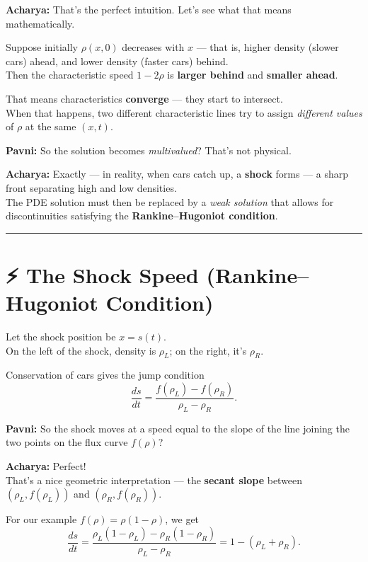 \documentclass[
  letterpaper,
]{book}
\begin{document}
\textbf{Acharya:} That's the perfect intuition. Let's see what that
means mathematically.

Suppose initially \(\rho(x,0)\) decreases with \(x\) --- that is, higher
density (slower cars) ahead, and lower density (faster cars) behind.\\
Then the characteristic speed \(1 - 2\rho\) is \textbf{larger behind}
and \textbf{smaller ahead}.

That means characteristics \textbf{converge} --- they start to
intersect.\\
When that happens, two different characteristic lines try to assign
\emph{different values} of \(\rho\) at the same \((x,t)\).

\textbf{Pavni:} So the solution becomes \emph{multivalued}? That's not
physical.

\textbf{Acharya:} Exactly --- in reality, when cars catch up, a
\textbf{shock} forms --- a sharp front separating high and low
densities.\\
The PDE solution must then be replaced by a \emph{weak solution} that
allows for discontinuities satisfying the \textbf{Rankine--Hugoniot
condition}.

\begin{center}\rule{0.5\linewidth}{0.5pt}\end{center}

\section{⚡ The Shock Speed (Rankine--Hugoniot
Condition)}\label{the-shock-speed-rankinehugoniot-condition}

Let the shock position be \(x = s(t)\).\\
On the left of the shock, density is \(\rho_L\); on the right, it's
\(\rho_R\).

Conservation of cars gives the jump condition \[
\frac{ds}{dt} = \frac{f(\rho_L) - f(\rho_R)}{\rho_L - \rho_R}.
\]

\textbf{Pavni:} So the shock moves at a speed equal to the slope of the
line joining the two points on the flux curve \(f(\rho)\)?

\textbf{Acharya:} Perfect!\\
That's a nice geometric interpretation --- the \textbf{secant slope}
between \((\rho_L, f(\rho_L))\) and \((\rho_R, f(\rho_R))\).

For our example \(f(\rho) = \rho(1 - \rho)\), we get \[
\frac{ds}{dt} = \frac{\rho_L(1 - \rho_L) - \rho_R(1 - \rho_R)}{\rho_L - \rho_R}
              = 1 - (\rho_L + \rho_R).
\]
\end{document}
